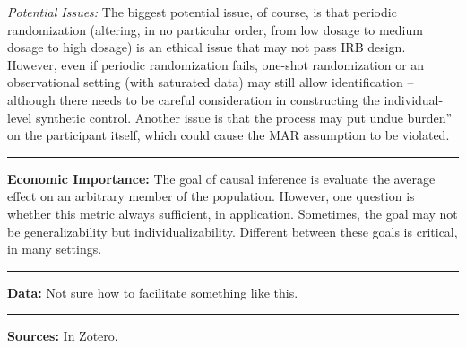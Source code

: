 \documentclass[12pt,letterpaper,doublespace, oneside]{article}
\begin{document}
\noindent

\emph{Potential Issues:} The biggest potential issue, of course, is that periodic randomization (altering, in no particular order, from low dosage to medium dosage to high dosage) is an ethical issue that may not pass IRB design. However, even if periodic randomization fails, one-shot randomization or an observational setting (with saturated data) may still allow identification -- although there needs to be careful consideration in constructing the individual-level synthetic control. Another issue is that the process may put undue burden'' on the participant itself, which could cause the MAR assumption to be violated. 

\noindent\rule{\linewidth}{0.4pt}

\noindent
\textbf{Economic Importance:} The goal of causal inference is evaluate the average effect on an arbitrary member of the population. However, one question is whether this metric always sufficient, in application. Sometimes, the goal may not be generalizability but individualizability. Different between these goals is critical, in many settings. 

\noindent\rule{\linewidth}{0.4pt}

\noindent
\textbf{Data:} Not sure how to facilitate something like this.

\noindent\rule{\linewidth}{0.4pt}

\noindent
\textbf{Sources:} In Zotero.



%
%
\end{document}
